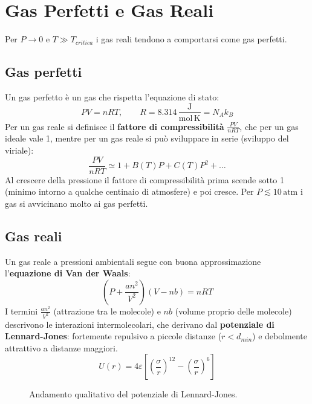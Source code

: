 \documentclass[11pt, a4paper, openright]{book}
\theoremstyle{plain}
\theoremstyle{definition}
\theoremstyle{remark}
\begin{document}
\chapter{Gas Perfetti e Gas Reali}
Per $P \to 0$ e $T \gg T_{critica}$ i gas reali tendono a comportarsi come gas perfetti.

\section{Gas perfetti}
Un gas perfetto è un gas che rispetta l'equazione di stato:
\begin{equation}
    PV = nRT, \qquad R = 8.314\,\frac{\text{J}}{\text{mol}\,\text{K}} = N_A k_B
\end{equation}
Per un gas reale si definisce il \textbf{fattore di compressibilità} $\frac{PV}{nRT}$, che per un gas ideale vale 1, mentre per un gas reale si può sviluppare in serie (sviluppo del viriale):
\begin{equation}
    \frac{PV}{nRT} \simeq 1 + B(T)P + C(T)P^2 + \dots
\end{equation}
Al crescere della pressione il fattore di compressibilità prima scende sotto 1 (minimo intorno a qualche centinaio di atmosfere) e poi cresce. Per $P \lesssim 10\,\text{atm}$ i gas si avvicinano molto ai gas perfetti.

\section{Gas reali}
Un gas reale a pressioni ambientali segue con buona approssimazione l'\textbf{equazione di Van der Waals}:
\begin{equation}
    \left(P + \frac{an^2}{V^2}\right)\left(V - nb\right) = nRT
\end{equation}
I termini $\frac{an^2}{V^2}$ (attrazione tra le molecole) e $nb$ (volume proprio delle molecole) descrivono le interazioni intermolecolari, che derivano dal \textbf{potenziale di Lennard-Jones}: fortemente repulsivo a piccole distanze ($r < d_{min}$) e debolmente attrattivo a distanze maggiori.
\begin{equation}
    U(r) = 4\varepsilon\left[\left(\frac{\sigma}{r}\right)^{12} - \left(\frac{\sigma}{r}\right)^{6}\right]
\end{equation}

\begin{figure}[H]
    \centering
    \caption{Andamento qualitativo del potenziale di Lennard-Jones.}
\end{figure}
\end{document}
